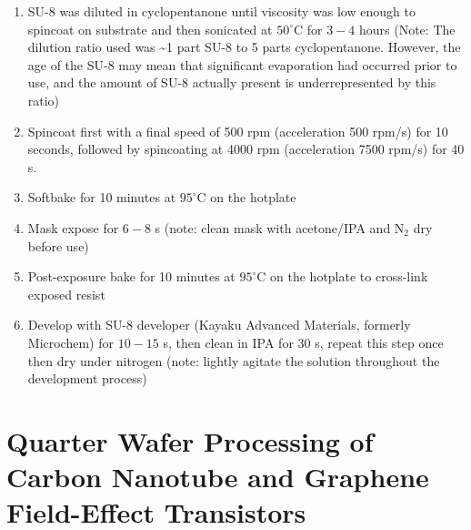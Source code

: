 \documentclass[
  a4paper,
]{scrbook}
\begin{document}
\begin{enumerate}
\def\labelenumi{\arabic{enumi}.}
\item
  SU-8 was diluted in cyclopentanone until viscosity was low enough to
  spincoat on substrate and then sonicated at \(50^\circ\)C for \(3-4\)
  hours (Note: The dilution ratio used was \textasciitilde1 part SU-8 to
  5 parts cyclopentanone. However, the age of the SU-8 may mean that
  significant evaporation had occurred prior to use, and the amount of
  SU-8 actually present is underrepresented by this ratio)
\item
  Spincoat first with a final speed of 500 rpm (acceleration 500 rpm/s)
  for 10 seconds, followed by spincoating at 4000 rpm (acceleration 7500
  rpm/s) for 40 s.
\item
  Softbake for 10 minutes at \(95^\circ\)C on the hotplate
\item
  Mask expose for \(6-8\) s (note: clean mask with acetone/IPA and
  N\(_2\) dry before use)
\item
  Post-exposure bake for 10 minutes at \(95^\circ\)C on the hotplate to
  cross-link exposed resist
\item
  Develop with SU-8 developer (Kayaku Advanced Materials, formerly
  Microchem) for \(10-15\) s, then clean in IPA for 30 s, repeat this
  step once then dry under nitrogen (note: lightly agitate the solution
  throughout the development process)
\end{enumerate}

\hypertarget{sec-qw-processing}{%
\section{Quarter Wafer Processing of Carbon Nanotube and Graphene
Field-Effect Transistors}\label{sec-qw-processing}}
\end{document}
